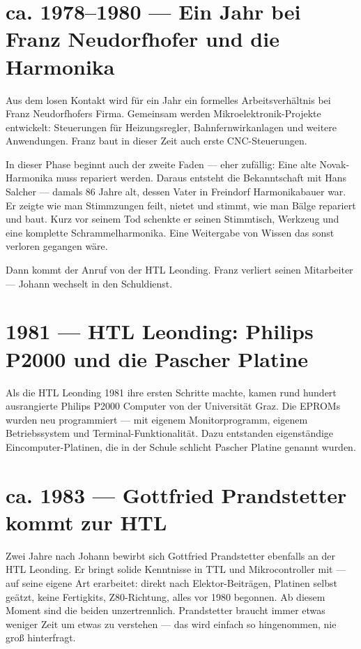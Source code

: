 \documentclass[a4paper,12pt]{article}
\begin{document}
\section{ca. 1978--1980 --- Ein Jahr bei Franz Neudorfhofer und die Harmonika}

Aus dem losen Kontakt wird für ein Jahr ein formelles Arbeitsverhältnis bei Franz Neudorfhofers Firma. Gemeinsam werden Mikroelektronik-Projekte entwickelt: Steuerungen für Heizungsregler, Bahnfernwirkanlagen und weitere Anwendungen. Franz baut in dieser Zeit auch erste CNC-Steuerungen.

In dieser Phase beginnt auch der zweite Faden --- eher zufällig: Eine alte Novak-Harmonika muss repariert werden. Daraus entsteht die Bekanntschaft mit Hans Salcher --- damals 86 Jahre alt, dessen Vater in Freindorf Harmonikabauer war. Er zeigte wie man Stimmzungen feilt, nietet und stimmt, wie man Bälge repariert und baut. Kurz vor seinem Tod schenkte er seinen Stimmtisch, Werkzeug und eine komplette Schrammelharmonika. Eine Weitergabe von Wissen das sonst verloren gegangen wäre.

Dann kommt der Anruf von der HTL Leonding. Franz verliert seinen Mitarbeiter --- Johann wechselt in den Schuldienst.

\section{1981 --- HTL Leonding: Philips P2000 und die Pascher Platine}

Als die HTL Leonding 1981 ihre ersten Schritte machte, kamen rund hundert ausrangierte Philips P2000 Computer von der Universität Graz. Die EPROMs wurden neu programmiert --- mit eigenem Monitorprogramm, eigenem Betriebssystem und Terminal-Funktionalität. Dazu entstanden eigenständige Eincomputer-Platinen, die in der Schule schlicht \glqq Pascher Platine\grqq{} genannt wurden.

\section{ca. 1983 --- Gottfried Prandstetter kommt zur HTL}

Zwei Jahre nach Johann bewirbt sich Gottfried Prandstetter ebenfalls an der HTL Leonding. Er bringt solide Kenntnisse in TTL und Mikrocontroller mit --- auf seine eigene Art erarbeitet: direkt nach Elektor-Beiträgen, Platinen selbst geätzt, keine Fertigkits, Z80-Richtung, alles vor 1980 begonnen. Ab diesem Moment sind die beiden unzertrennlich. Prandstetter braucht immer etwas weniger Zeit um etwas zu verstehen --- das wird einfach so hingenommen, nie groß hinterfragt.
\end{document}
